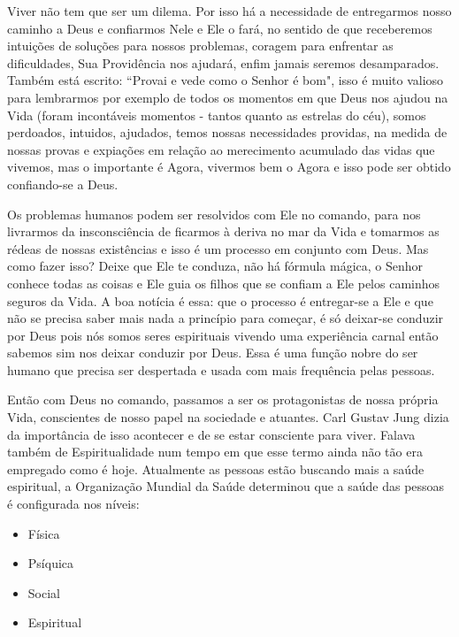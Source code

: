 \emdash{}Viver não tem que ser um dilema. Por isso há a necessidade de entregarmos nosso caminho a Deus e confiarmos Nele e Ele o fará, no sentido de que receberemos intuições de soluções para nossos problemas, coragem para enfrentar as dificuldades, Sua Providência nos ajudará, enfim jamais seremos desamparados. Também está escrito: ``Provai e vede como o Senhor é bom", isso é muito valioso para lembrarmos por exemplo de todos os momentos em que Deus nos ajudou na Vida (foram incontáveis momentos - tantos quanto as estrelas do céu), somos perdoados, intuidos, ajudados, temos nossas necessidades providas, na medida de nossas provas e expiações em relação ao merecimento acumulado das vidas que vivemos, mas o importante é Agora, vivermos bem o Agora e isso pode ser obtido confiando-se a Deus.

\emdash{}Os problemas humanos podem ser resolvidos com Ele no comando, para nos livrarmos da insconsciência de ficarmos à deriva no mar da Vida e tomarmos as rédeas de nossas existências e isso é um processo em conjunto com Deus. Mas como fazer isso? Deixe que Ele te conduza, não há fórmula mágica, o Senhor conhece todas as coisas e Ele guia os filhos que se confiam a Ele pelos caminhos seguros da Vida. A boa notícia é essa: que o processo é entregar-se a Ele e que não se precisa saber mais nada a princípio para começar, é só deixar-se conduzir por Deus pois nós somos seres espirituais vivendo uma experiência carnal então sabemos sim nos deixar conduzir por Deus. Essa é uma função nobre do ser humano que precisa ser despertada e usada com mais frequência pelas pessoas.

\emdash{}Então com Deus no comando, passamos a ser os protagonistas de nossa própria Vida, conscientes de nosso papel na sociedade e atuantes. Carl Gustav Jung dizia da importância de isso acontecer e de se estar consciente para viver. Falava também de Espiritualidade num tempo em que esse termo ainda não tão era empregado como é hoje. Atualmente as pessoas estão buscando mais a saúde espiritual, a Organização Mundial da Saúde determinou que a saúde das pessoas é configurada nos níveis:

\begin{itemize}
    \item Física
    \item Psíquica
    \item Social
    \item Espiritual
\end{itemize}

